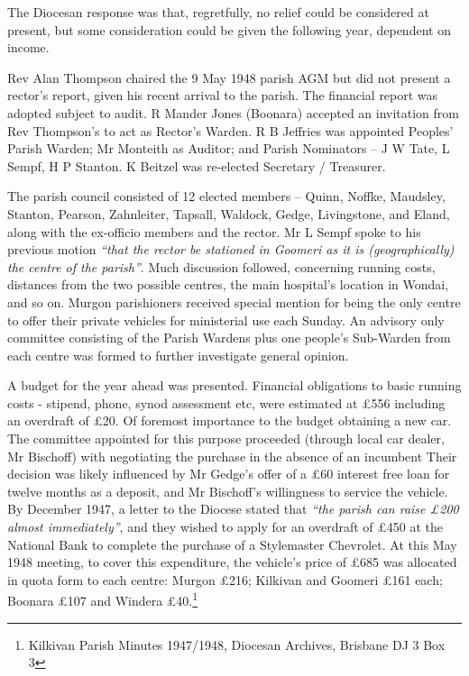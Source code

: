The Diocesan response was that, regretfully, no relief could be considered at present, but some consideration could be given the following year, dependent on income.



Rev Alan Thompson chaired the 9 May 1948 parish AGM but did not present a rector's report, given his recent arrival to the parish. The financial report was adopted subject to audit. R Mander Jones (Boonara) accepted an invitation from Rev Thompson's to act as Rector's Warden. R B Jeffries was appointed Peoples' Parish Warden; Mr Monteith as Auditor; and Parish Nominators -- J W Tate, L Sempf, H P Stanton. K Beitzel was re-elected Secretary / Treasurer.



The parish council consisted of 12 elected members -- Quinn, Noffke, Maudsley, Stanton, Pearson, Zahnleiter, Tapsall, Waldock, Gedge, Livingstone, and Eland, along with the ex-officio members and the rector. Mr L Sempf spoke to his previous motion \emph{``that the rector be stationed in Goomeri as it is (geographically) the centre of the parish''}. Much discussion followed, concerning running costs, distances from the two possible centres, the main hospital's location in Wondai, and so on. Murgon parishioners received special mention for being the only centre to offer their private vehicles for ministerial use each Sunday. An advisory only committee consisting of the Parish Wardens plus one people's Sub-Warden from each centre was formed to further investigate general opinion.



A budget for the year ahead was presented. Financial obligations to basic running costs - stipend, phone, synod assessment etc, were estimated at \pounds556 including an overdraft of \pounds20. Of foremost importance to the budget obtaining a new car. The committee appointed for this purpose proceeded (through local car dealer, Mr Bischoff) with negotiating the purchase in the absence of an incumbent Their decision was likely influenced by Mr Gedge's offer of a \pounds60 interest free loan for twelve months as a deposit, and Mr Bischoff's willingness to service the vehicle. By December 1947, a letter to the Diocese stated that \emph{``the parish can raise \pounds200 almost immediately''}, and they wished to apply for an overdraft of \pounds450 at the National Bank to complete the purchase of a Stylemaster Chevrolet. At this May 1948 meeting, to cover this expenditure, the vehicle's price of \pounds685 was allocated in quota form to each centre: Murgon \pounds216; Kilkivan and Goomeri \pounds161 each; Boonara \pounds107 and Windera \pounds40.\footnote{Kilkivan Parish Minutes 1947/1948, Diocesan Archives, Brisbane DJ 3 Box 3}


